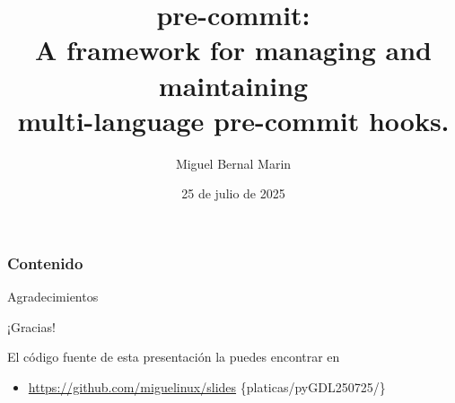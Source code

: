 \documentclass[aspectratio=169]{beamer}
\title[pre-commit]{pre-commit:\\
A framework for managing and maintaining\\
multi-language pre-commit hooks.}
\author[\textcircled{cc} BY-SA 4.0]{Miguel Bernal Marin}
\institute[Pythonitas GDL]
{
Pythonistas GDL \\
\medskip
\textit{\href{mailto:miguel.bernal.marin@gmail.com}{miguel.bernal.marin@gmail.com}}\\
Telegram: \textit{\href{https://t.me/miguelinux}{@miguelinux}}
}
\date{
  25 de julio de 2025
}
\begin{document}
\begin{frame}
    \titlepage
\end{frame}



\begin{frame}
    \frametitle{Contenido}
    \tableofcontents
\end{frame}



\begin{frame}{Agradecimientos}

  \begin{center}
    \huge ¡Gracias!
  \end{center}

  El código fuente de esta presentación la puedes encontrar en
  \begin{itemize}
    \item \href{https://github.com/miguelinux/slides}
      {https://github.com/miguelinux/slides}
      \{platicas/pyGDL250725/\}

  \end{itemize}
\end{frame}
\end{document}
